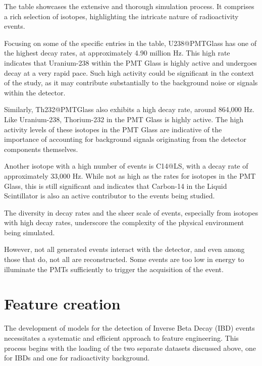 The table showcases the extensive and thorough simulation process. It comprises a rich selection of isotopes, highlighting the intricate nature of radioactivity events.

Focusing on some of the specific entries in the table, U238@PMTGlass has one of the highest decay rates, at approximately 4.90 million Hz. This high rate indicates that Uranium-238 within the PMT Glass is highly active and undergoes decay at a very rapid pace. Such high activity could be significant in the context of the study, as it may contribute substantially to the background noise or signals within the detector.

Similarly, Th232@PMTGlass also exhibits a high decay rate, around 864,000 Hz. Like Uranium-238, Thorium-232 in the PMT Glass is highly active. The high activity levels of these isotopes in the PMT Glass are indicative of the importance of accounting for background signals originating from the detector components themselves.

Another isotope with a high number of events is C14@LS, with a decay rate of approximately 33,000 Hz. While not as high as the rates for isotopes in the PMT Glass, this is still significant and indicates that Carbon-14 in the Liquid Scintillator is also an active contributor to the events being studied.

The diversity in decay rates and the sheer scale of events, especially from isotopes with high decay rates, underscore the complexity of the physical environment being simulated. 

However, not all generated events interact with the detector, and even among those that do, not all are reconstructed. Some events are too low in energy to illuminate the PMTs sufficiently to trigger the acquisition of the event.


\newpage

\section{Feature creation}

The development of models for the detection of Inverse Beta Decay (IBD) events necessitates a systematic and efficient approach to feature engineering. This process begins with the loading of the two separate datasets discussed above, one for IBDs and one for radioactivity background.

